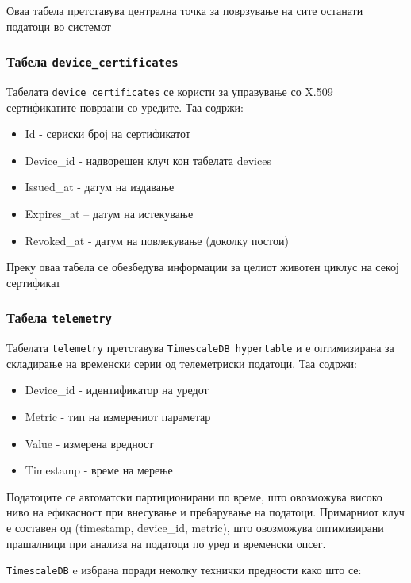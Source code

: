 Оваа табела претставува централна точка за поврзување на сите останати
податоци во системот

\subsubsection{Табела \texttt{device\_certificates}}

Табелата \texttt{device\_certificates} се користи за управување со X.509
сертификатите поврзани со уредите. Таа содржи:

\begin{itemize}
\item
  Id - сериски број на сертификатот
\item
  Device\_id - надворешен клуч кон табелата devices
\item
  Issued\_at - датум на издавање
\item
  Expires\_at -- датум на истекување
\item
  Revoked\_at - датум на повлекување (доколку постои)
\end{itemize}

Преку оваа табела се обезбедува информации за целиот животен циклус на
секој сертификат

\subsubsection{Табела \texttt{telemetry}}

Табелата \texttt{telemetry} претставува \texttt{TimescaleDB hypertable} и е
оптимизирана за складирање на временски серии од телеметриски податоци.
Таа содржи:

\begin{itemize}
\item
  Device\_id - идентификатор на уредот
\item
  Metric - тип на измерениот параметар
\item
  Value - измерена вредност
\item
  Timestamp - време на мерење
\end{itemize}

Податоците се автоматски партиционирани по време, што овозможува високо
ниво на ефикасност при внесување и пребарување на податоци. Примарниот
клуч е составен од (timestamp, device\_id, metric), што овозможува
оптимизирани прашалници при анализа на податоци по уред и временски
опсег.

\texttt{TimescaleDB} e избрана поради неколку технички предности како што се:

